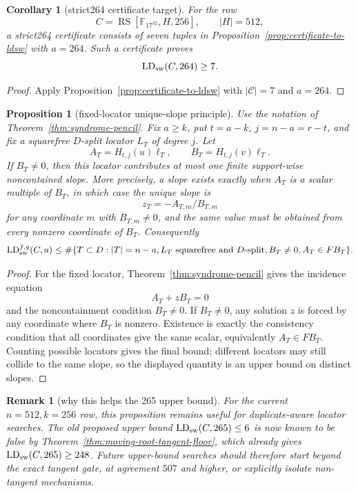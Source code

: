 \documentclass[11pt]{article}
\newtheorem{proposition}{Proposition}
\newtheorem{corollary}{Corollary}
\newtheorem{remark}{Remark}
\newcommand{\F}{\mathbb F}
\newcommand{\RS}{\operatorname{RS}}
\begin{document}
\begin{corollary}[strict264 certificate target]
\label{cor:strict264-certificate-target}
For the row
\[
  C=\RS[\F_{17^{32}},H,256],
  \qquad |H|=512,
\]
a strict264 certificate consists of seven tuples in
Proposition~\ref{prop:certificate-to-ldsw} with \(a=264\).  Such a certificate
proves
\[
  \operatorname{LD}_{\rm sw}(C,264)\ge 7.
\]
\end{corollary}

\begin{proof}
Apply Proposition~\ref{prop:certificate-to-ldsw} with
\(|\mathcal C|=7\) and \(a=264\).
\end{proof}

\begin{proposition}[fixed-locator unique-slope principle]
\label{prop:fixed-locator-unique-slope}
Use the notation of Theorem~\ref{thm:syndrome-pencil}.  Fix
\(a\ge k\), put \(t=a-k\), \(j=n-a=r-t\), and fix a squarefree
\(D\)-split locator \(L_T\) of degree \(j\).  Let
\[
  A_T=H_{t,j}(u)\boldsymbol\ell_T,
  \qquad
  B_T=H_{t,j}(v)\boldsymbol\ell_T.
\]
If \(B_T\ne0\), then this locator contributes at most one finite
support-wise noncontained slope.  More precisely, a slope exists exactly when
\(A_T\) is a scalar multiple of \(B_T\), in which case the unique slope is
\[
  z_T=-A_{T,m}/B_{T,m}
\]
for any coordinate \(m\) with \(B_{T,m}\ne0\), and the same value must be
obtained from every nonzero coordinate of \(B_T\).
Consequently
\[
  \operatorname{LD}_{\rm sw}^{f,g}(C,a)
  \le
  \#\{T\subset D:
        |T|=n-a,
        L_T\text{ squarefree and }D\text{-split},
        B_T\ne0,
        A_T\in F B_T\}.
\]
\end{proposition}

\begin{proof}
For the fixed locator, Theorem~\ref{thm:syndrome-pencil} gives the incidence
equation
\[
  A_T+zB_T=0
\]
and the noncontainment condition \(B_T\ne0\).  If \(B_T\ne0\), any solution
\(z\) is forced by any coordinate where \(B_T\) is nonzero.  Existence is exactly
the consistency condition that all coordinates give the same scalar, equivalently
\(A_T\in F B_T\).  Counting possible locators gives the final bound; different
locators may still collide to the same slope, so the displayed quantity is an
upper bound on distinct slopes.
\end{proof}

\begin{remark}[why this helps the 265 upper bound]
For the current \(n=512,k=256\) row, this proposition remains useful for
duplicate-aware locator searches.  The old proposed upper bound
\(\operatorname{LD}_{\rm sw}(C,265)\le6\) is now known to be false by
Theorem~\ref{thm:moving-root-tangent-floor}, which already gives
\(\operatorname{LD}_{\rm sw}(C,265)\ge248\).  Future upper-bound searches should
therefore start beyond the exact tangent gate, at agreement \(507\) and higher,
or explicitly isolate non-tangent mechanisms.
\end{remark}
\end{document}
